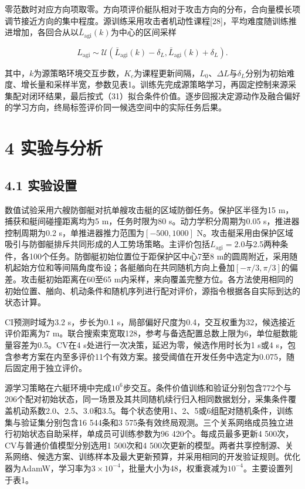 \documentclass[UTF8,a4paper,zihao=5,fontset=none]{ctexart}
\begin{document}
零范数时对应方向项取零。方向项评价艇队相对于攻击方向的分布，合向量模长项调节接近方向的集中程度。源训练采用攻击者机动性课程{[}28{]}，平均难度随训练推进增加，各回合从以\(\bar L_{\mathrm{agi}}(k)\)为中心的区间采样

\[
L_{\mathrm{agi}}\sim\mathcal U\!\left(
\bar L_{\mathrm{agi}}(k)-\delta_L,
\bar L_{\mathrm{agi}}(k)+\delta_L\right).
\tag{37}
\]

其中，\(k\)为源策略环境交互步数，\(K_c\)为课程更新间隔，\(L_0\)、\(\Delta L\)与\(\delta_L\)分别为初始难度、增长量和采样半宽，参数见表1。训练先完成源策略学习，再固定控制来源采集配对闭环结果，最后按式（31）拟合条件价值。逐步回报决定源动作及融合偏好的学习方向，终局标签评价同一候选空间中的实际任务后果。

\FloatBarrier\section*{4 实验与分析}

\subsection*{4.1 实验设置}

数值试验采用六艘防御艇对抗单艘攻击艇的区域防御任务。保护区半径为15 m，捕获和艇间碰撞距离均为5 m，任务时限为80 s。动力学积分周期为0.05 s，推进器控制周期为0.2 s，单推进器推力范围为\([-500,1000]\) N。攻击艇采用由保护区域吸引与防御艇排斥共同形成的人工势场策略。主评价包括\(L_{\mathrm{agi}}=2.0\)与2.5两种条件，各100个任务。防御艇初始位置位于距保护区中心7至8 m的圆周附近，采用随机起始方位和等间隔角度布设；各艇艏向在共同随机方向上叠加\([-\pi/3,\pi/3]\)的偏差。攻击艇初始距离在60至65 m内采样，来向覆盖完整方位。各方法使用相同的初始位置、艏向、机动条件和随机序列进行配对评价，源指令根据各自实际到达的状态计算。

CI预测时域为3.2 s，步长为0.1 s，局部偏好尺度为0.4，交互权重为32，候选接近评价距离为7 m。联合搜索束宽取128，参考与备选配置总数上限为6，单位艇数能量容差为0.5。CV在4 s处进行一次决策，延迟为零，候选作用时长为1 s或4 s，包含参考方案在内至多评价11个有效方案。接受阈值在开发任务中选定为0.075，随后固定用于独立评价。

源学习策略在六艇环境中完成\(10^6\)步交互。条件价值训练和验证分别包含772个与206个配对初始状态，同一场景及其共同随机续行归入相同数据划分，采集条件覆盖机动系数2.0、2.5、3.0和3.5。每个状态使用1、2、5或6组配对随机条件，训练集与验证集分别包含16 544条和3 575条有效终局观测。三个关系网络成员独立进行初始状态自助采样，单成员可训练参数为96 420个。每成员最多更新4 500次，CV与普通价值模型分别选用1 500次和4 500次更新的模型。两者共享控制源、关系网络、候选方案、训练样本及最大更新预算，并采用相同的开发验证规则。优化器为AdamW，学习率为\(3\times10^{-4}\)，批量大小为48，权重衰减为\(10^{-4}\)。主要设置列于表1。
\end{document}
